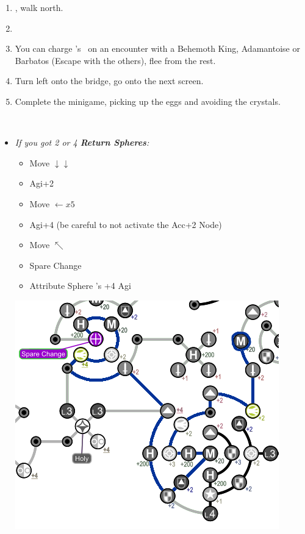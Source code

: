 \begin{enumerate}[resume]
    \item \sd, walk north.
    \item \formation{\tidus}{\kimahri}{\auron}
    \item You can charge \rikku's \od\ on an encounter with a Behemoth King, Adamantoise or Barbatos (Escape with the others), flee from the rest.
    \item Turn left onto the bridge, go onto the next screen.
    \item Complete the minigame, picking up the eggs and avoiding the crystals.
\end{enumerate}
\bothvfill\winvfill\lossvfill
\ 
\colend
\begin{spheregrid}
    \begin{multicols}{2}
        \begin{itemize}
            \item \textit{If you got 2 or 4 \textbf{Return Spheres}:}
            \begin{itemize}
                \item Move $\downarrow\downarrow$
                \item Agi+2
                \item Move $\leftarrow x5$
                \item Agi+4 (be careful to not activate the Acc+2 Node)
                \item Move $\nwarrow$
                \item Spare Change
                \item Attribute Sphere \kimahri's +4 Agi
            \end{itemize}
            \includegraphics[width=.8\columnwidth]{graphics/4_Return_final_grid}

\end{itemize}
\end{multicols}
\end{spheregrid}

